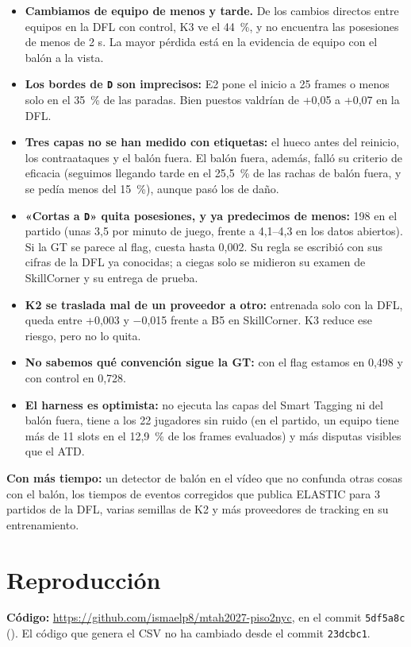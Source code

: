 \documentclass[10pt,a4paper]{article}
\newcommand{\code}[1]{\texttt{\textcolor{codigo}{#1}}}
\begin{document}
\begin{itemize}
  \item \textbf{Cambiamos de equipo de menos y tarde.} De los cambios directos entre equipos en la DFL con control, K3 ve el 44~\%, y no encuentra las posesiones de menos de 2 s. La mayor pérdida está en la evidencia de equipo con el balón a la vista.
  \item \textbf{Los bordes de \code{D} son imprecisos:} E2 pone el inicio a 25 frames o menos solo en el 35~\% de las paradas. Bien puestos valdrían de +0,05 a +0,07 en la DFL.
  \item \textbf{Tres capas no se han medido con etiquetas:} el hueco antes del reinicio, los contraataques y el balón fuera. El balón fuera, además, falló su criterio de eficacia (seguimos llegando tarde en el 25,5~\% de las rachas de balón fuera, y se pedía menos del 15~\%), aunque pasó los de daño.
  \item \textbf{«Cortas a \code{D}» quita posesiones, y ya predecimos de menos:} 198 en el partido (unas 3,5 por minuto de juego, frente a 4,1–4,3 en los datos abiertos). Si la GT se parece al flag, cuesta hasta 0,002. Su regla se escribió con sus cifras de la DFL ya conocidas; a ciegas solo se midieron su examen de SkillCorner y su entrega de prueba.
  \item \textbf{K2 se traslada mal de un proveedor a otro:} entrenada solo con la DFL, queda entre +0,003 y −0,015 frente a B5 en SkillCorner. K3 reduce ese riesgo, pero no lo quita.
  \item \textbf{No sabemos qué convención sigue la GT:} con el flag estamos en 0,498 y con control en 0,728.
  \item \textbf{El harness es optimista:} no ejecuta las capas del Smart Tagging ni del balón fuera, tiene a los 22 jugadores sin ruido (en el partido, un equipo tiene más de 11 slots en el 12,9~\% de los frames evaluados) y más disputas visibles que el ATD.
\end{itemize}

\textbf{Con más tiempo:} un detector de balón en el vídeo que no confunda otras cosas con el balón, los tiempos de eventos corregidos que publica ELASTIC para 3 partidos de la DFL, varias semillas de K2 y más proveedores de tracking en su entrenamiento.

\section{Reproducción}\label{sec:7}

\textbf{Código:} \url{https://github.com/ismaelp8/mtah2027-piso2nyc}, en el commit \code{5df5a8c} (\code{}). El código que genera el CSV no ha cambiado desde el commit \code{23dcbc1}.
\end{document}

